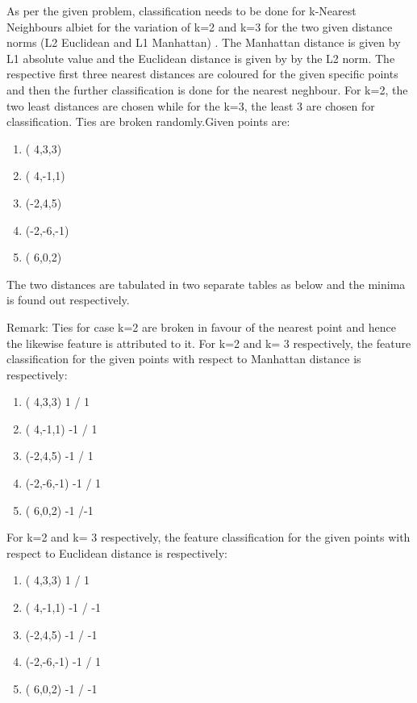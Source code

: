 

As per the given problem, classification needs to be done for k-Nearest Neighbours albiet for the variation of k=2 and k=3 for the two given distance norms (L2 Euclidean and L1 Manhattan) . The Manhattan distance is given by L1 absolute value and the Euclidean distance is given by by the L2 norm.
 The respective first three nearest distances are coloured for the given specific points and then the further classification is done for the nearest neghbour. For k=2, the two least distances are chosen while for the k=3, the least 3 are chosen for classification. Ties are broken randomly.Given points are:
\begin {enumerate}
	\item( 4,3,3)   
	\item( 4,-1,1)  
	\item(-2,4,5)   
	\item(-2,-6,-1) 
	\item( 6,0,2)  
\end {enumerate}
The two distances are tabulated in two separate tables as below and the minima is found out respectively.


Remark: Ties for case k=2 are broken in favour of the nearest point and hence the likewise feature is attributed to it.
For k=2 and k= 3 respectively, the feature classification for the given points with respect to Manhattan distance is respectively:
\begin {enumerate}
	\item( 4,3,3)      1 / 1
	\item( 4,-1,1)    -1 / 1
	\item(-2,4,5)     -1 / 1
	\item(-2,-6,-1)   -1 / 1
	\item( 6,0,2)     -1 /-1
\end {enumerate}
For k=2 and k= 3 respectively, the feature classification for the given points with respect to Euclidean distance is respectively:
\begin {enumerate}
	\item( 4,3,3)     1 /  1
	\item( 4,-1,1)   -1 / -1
	\item(-2,4,5)    -1 / -1
	\item(-2,-6,-1)  -1 /  1
	\item( 6,0,2)    -1 / -1
\end {enumerate}
